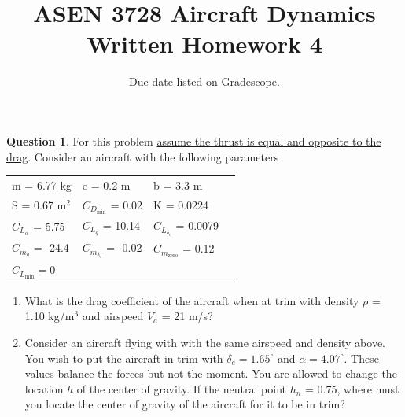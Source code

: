\documentclass{article}
\title{ASEN 3728 Aircraft Dynamics\\Written Homework 4}
\date{Due date listed on Gradescope.}
\theoremstyle{definition}
\newtheorem{question}{Question}
\begin{document}
\maketitle

\begin{question}

For this problem \underline{assume the thrust is equal and opposite to the drag}. Consider an aircraft with the following parameters
\begin{table}[!h]
\centering
\label{my-label}
\begin{tabular}{llll}
 m = 6.77 kg & c = 0.2 m   & b = 3.3 m \\
 S = 0.67 m$^2$ & $C_{D_\text{min}}$ = 0.02  &  K = 0.0224   \\
 $C_{L_{\alpha}}$ = 5.75 & $C_{L_{q}}$ = 10.14  & $C_{L_{\delta_e}}$ = 0.0079  \\
 $C_{m_{q}}$ = -24.4  & $C_{m_{\delta_e}}$ = -0.02  & $C_{m_{\text{zero}}}$ = 0.12\\
 $C_{L_\text{min}} = 0$ & & 
\end{tabular}
\end{table}

\begin{enumerate}
\item What is the drag coefficient of the aircraft when at trim with density $\rho$ = 1.10 kg/m$^3$ and airspeed $V_a$ = 21 m/s?

\item Consider an aircraft flying with with the same airspeed and density above. You wish to put the aircraft in trim with $\delta_e = 1.65^{\circ}$ and $\alpha = 4.07^{\circ}$. These values balance the forces but not the moment. You are allowed to change the location $h$ of the center of gravity. If the neutral point $h_n$ = 0.75, where must you locate the center of gravity of the aircraft for it to be in trim?
\end{enumerate}
\end{question}

\vspace{0.1cm}
\clearpage

\vspace{0.1cm}
\end{document}
